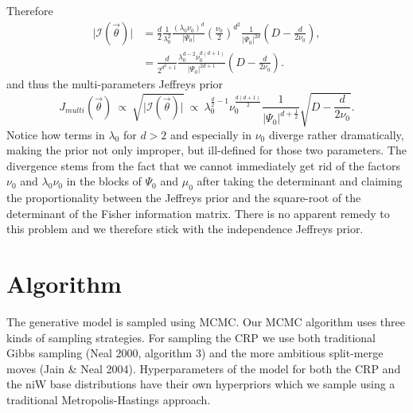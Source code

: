 \documentclass[11pt, oneside]{article}   	%
\begin{document}
Therefore
\begin{equation}\begin{split}
\vert\mathcal I(\vec\theta)\vert &= \frac{d}{2}\frac{1}{\lambda_0^2}\frac{(\lambda_0\nu_0)^d}{\vert\Psi_0\vert}\left(\frac{\nu_0}{2}\right)^{d^2}\frac{1}{\vert\Psi_0\vert^{2d}}\left(D - \frac{d}{2\nu_0}\right), \\
&= \frac{d}{2^{d^2 + 1}}\frac{\lambda_0^{d-2}\nu_0^{d(d + 1)}}{\vert\Psi_0\vert^{2d + 1}}\left(D -\frac{d}{2\nu_0}\right).
\end{split}\end{equation}
and thus the multi-parameters Jeffreys prior
$$J_{multi}(\vec\theta)~\propto~ \sqrt{\vert\mathcal I(\vec\theta)\vert}~\propto~\lambda_0^{\frac{d}{2}-1}\nu_0^{\frac{d(d+1)}{2}}\frac{1}{\vert\Psi_0\vert^{d+\frac{1}{2}}}\sqrt{D - \frac{d}{2\nu_0}}.$$
Notice how terms in $\lambda_0$ for $d > 2$ and especially in $\nu_0$ diverge rather dramatically, making the prior not only improper, but ill-defined for those two parameters. The divergence stems from the fact that we cannot immediately get rid of the factors $\nu_0$ and $\lambda_0\nu_0$ in the blocks of $\Psi_0$ and $\mu_0$ after taking the determinant and claiming the proportionality between the Jeffreys prior and the square-root of the determinant of the Fisher information matrix. There is no apparent remedy to this problem and we therefore stick with the independence Jeffreys prior.

\section{Algorithm}
The generative model is sampled using MCMC. Our MCMC algorithm uses three kinds of sampling strategies. For sampling the CRP we use both traditional Gibbs sampling (Neal 2000, algorithm 3) and the more ambitious split-merge moves (Jain \& Neal 2004). Hyperparameters of the model for both the CRP and the niW base distributions have their own hyperpriors which we sample using a traditional Metropolis-Hastings approach.
\end{document}
